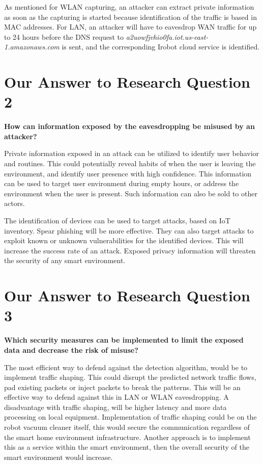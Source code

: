 As mentioned for \gls{WLAN} capturing, an attacker can extract private information as soon as the capturing is started because identification of the traffic is based in \gls{MAC} addresses. For \gls{LAN}, an attacker will have to eavesdrop \gls{WAN} traffic for up to 24 hours before the \gls{DNS} request to \textit{a2uowfjvhio0fa.iot.us-east-1.amazonaws.com} is sent, and the corresponding Irobot cloud service is identified. 

\section{Our Answer to Research Question  2}
\textbf{How can information exposed by the eavesdropping be misused by an attacker?} 

Private information exposed in an attack can be utilized to identify user behavior and routines. This could potentially reveal habits of when the user is leaving the environment, and identify user presence with high confidence. This information can be used to target user environment during empty hours, or address the environment when the user is present. Such information can also be sold to other actors. 

The identification of devices can be used  to target attacks, based on \gls{IoT} inventory. Spear phishing \cite{spear_phishing} will be more effective. They can also target attacks to exploit known or unknown vulnerabilities for the identified devices. This will increase the success rate of an attack. Exposed privacy information will threaten the security of any smart environment. 

\section{Our Answer to Research Question  3}
\textbf{Which security measures can be implemented to limit the exposed data and decrease the risk of misuse?} 

The most efficient way to defend against the detection algorithm, would be to implement traffic shaping. This could disrupt the predicted network traffic flows, pad existing packets or inject packets to break the patterns. This will be an effective way to defend against this in \gls{LAN} or \gls{WLAN} eavesdropping. A disadvantage with traffic shaping, will be higher latency and more data processing on local equipment. Implementation of traffic shaping could be on the robot vacuum cleaner itself, this would secure the communication regardless of the smart home environment infrastructure. Another approach is to implement this as a service within the smart environment, then the overall security of the smart environment would increase. 

